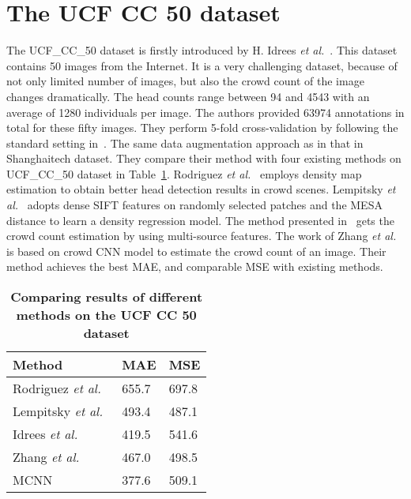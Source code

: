 \documentclass[10pt,twocolumn,letterpaper]{article}
\begin{document}
\section{The UCF CC 50 dataset}
The UCF\_CC\_50 dataset is firstly introduced by H. Idrees \emph{et al.}~\cite{name12}. This dataset contains 50 images from the Internet. It is a very challenging dataset, because of not only limited number of images, but also the crowd count of the image changes dramatically. The head counts range between 94 and 4543 with an average of 1280 individuals per image. The authors provided 63974 annotations in total for these fifty images. They perform 5-fold cross-validation by following the standard setting in~\cite{name12}. The same data augmentation approach as in that in Shanghaitech dataset.
 They compare their method with four existing methods on UCF\_CC\_50 dataset in Table~\ref{Table2}. Rodriguez \emph{et al.}~\cite{name26} employs density map estimation to obtain better head detection results in crowd scenes. Lempitsky \emph{et al.}~\cite{name17} adopts
dense SIFT features on randomly selected patches and the MESA distance to learn a density regression model. The method presented in~\cite{name12} gets the crowd count estimation by using multi-source features. The work of Zhang \emph{et al.}~\cite{name33} is based on crowd CNN model to estimate the crowd count of an image. Their method achieves the best MAE, and comparable MSE with existing methods.
 \begin{table}[htbp]
  \centering
 \begin{tabular}{|p{3cm}|p{1cm}|p{1cm}|}
    \hline
     Method &  MAE & MSE \\
    \hline
    Rodriguez \emph{et al.}~\cite{name26} & 655.7 & 697.8\\
    \hline
    Lempitsky \emph{et al.}~\cite{name17} & 493.4 & 487.1 \\
    \hline
    Idrees \emph{et al.}~\cite{name12} & 419.5 & 541.6\\
    \hline
    Zhang \emph{et al.}~\cite{name33} & 467.0 & 498.5\\
    \hline
     MCNN & 377.6 & 509.1\\
    \hline
  \end{tabular}
  \caption{\textbf{Comparing results of different methods on the UCF CC 50 dataset}} \label{Table2}
  \end{table}


\end{document}
